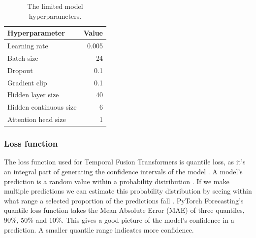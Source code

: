         \begin{table}[ht!]
        \begin{center}
        \caption{The limited model hyperparameters.
        \label{tab:lim_params}}
        \vspace{0.5cm}
        \begin{tabular}{|l|r|}
        \hline
        \textbf{Hyperparameter} & \textbf{Value} \\ \hline
        Learning rate            & 0.005         \\ \hline
        Batch size              & 24            \\ \hline
        Dropout                 & 0.1            \\ \hline
        Gradient clip           & 0.1           \\ \hline
        Hidden layer size            & 40         \\ \hline
        Hidden continuous size & 6         \\ \hline
        Attention head size    & 1         \\ \hline
        \end{tabular}
        
        \end{center}
        \end{table}
    
    \subsubsection{Loss function}\label{sec:loss_function}
    The loss function used for Temporal Fusion Transformers is quantile loss, as it's an integral part of generating the confidence intervals of the model \cite{lim_temporal_2020}.
    A model's prediction is a random value within a probability distribution \cite{wen_multi-horizon_2018}. If we make multiple predictions we can estimate this probability distribution by seeing within what range a selected proportion of the predictions fall \cite{koenker_quantile_2001}. PyTorch Forecasting's quantile loss function takes the Mean Absolute Error (MAE) of three quantiles, 90\%, 50\% and 10\%. This gives a good picture of the model's confidence in a prediction. A smaller quantile range indicates more confidence.
    
    
    
